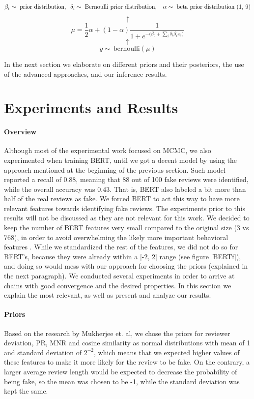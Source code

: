 \documentclass[man, floatsintext, 10pt]{apa6}
\begin{document}
 \[\beta_i \sim \text{ prior distribution}, \hspace{2mm} \delta_i \sim \text{ Bernoulli prior distribution}, \hspace{2mm}\  \alpha \sim \text{ beta prior distribution (1, 9)} \] \[ \uparrow \] \[ \mu = \frac{1}{2} \alpha + (1 - \alpha) \frac{1}{1 + e^{-\big(\beta_0 + \sum_i \delta_i \beta_i x_i \big)}} \] \vspace{0.01mm}  \[ \uparrow \] \[ y \sim\ \text{bernoulli} (\mu) \]
 
In the next section we elaborate on different priors and their posteriors, the use of the advanced approaches, and our inference results.

\section{Experiments and Results}

\paragraph{Overview} Although most of the experimental work focused on MCMC, we also experimented when training BERT, until we got a decent model by using the approach mentioned at the beginning of the previous section. Such model reported a recall of 0.88, meaning that 88 out of 100 fake reviews were identified, while the overall accuracy was 0.43. That is, BERT also labeled a bit more than half of the real reviews as fake. We forced BERT to act this way to have more relevant features towards identifying fake reviews. The experiments prior to this results will not be discussed as they are not relevant for this work. We decided to keep the number of BERT features very small compared to the original size (3 vs 768), in order to avoid overwhelming the likely more important behavioral features . While we standardized the rest of the features, we did not do so for BERT's, because they were already within a [-2, 2] range (see figure \ref{BERTf}), and doing so would mess with our approach for choosing the priors (explained in the next paragraph). We conducted several experiments in order to arrive at chains with good convergence and the desired properties. In this section we explain the most relevant, as well as present and analyze our results. 

\vspace{2mm}

\paragraph{Priors} Based on the research by Mukherjee et. al, we chose the priors for reviewer deviation, PR, MNR and cosine similarity as normal distributions with mean of 1 and standard deviation of $2^{-2}$, which means that we expected higher values of these features to make it more likely for the review to be fake. On the contrary, a larger average review length would be expected to decrease the probability of being fake, so the mean was chosen to be -1, while the standard deviation was kept the same.
\end{document}
